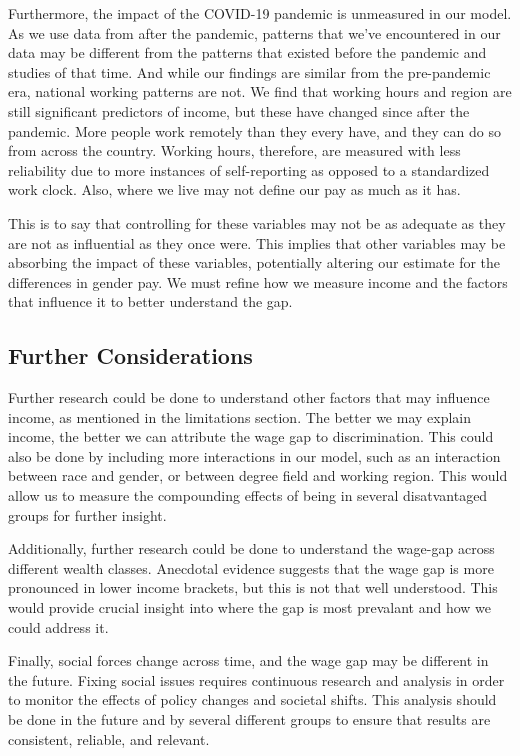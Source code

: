 \documentclass{article}
\begin{document}
Furthermore, the impact of the COVID-19 pandemic is unmeasured in our model. As we use data from after the pandemic, patterns that we've encountered in our data may be different
from the patterns that existed before the pandemic and studies of that time. And while our findings are similar from the pre-pandemic era, national working patterns are not.
We find that working hours and region are still significant predictors of income, but these have changed since after the pandemic. More people work remotely than they every have, and they can do so from across the country.
Working hours, therefore, are measured with less reliability due to more instances of self-reporting as opposed to a standardized work clock. Also, where we live may not define our pay as much as it has.

This is to say that controlling for these variables may not be as adequate as they are not as influential as they once were. This implies that other variables may be absorbing the impact of these variables, potentially altering our estimate for the differences 
in gender pay. We must refine how we measure income and the factors that influence it to better understand the gap.

\subsection*{Further Considerations}
Further research could be done to understand other factors that may influence income, as mentioned in the limitations section. The better
we may explain income, the better we can attribute the wage gap to discrimination. This could also be done by including more interactions in our model, such as an interaction between
race and gender, or between degree field and working region. This would allow us to measure the compounding effects of being in several disatvantaged groups for further insight.

Additionally, further research could be done to understand the wage-gap across different wealth classes. Anecdotal evidence suggests that the wage gap is more pronounced in lower income brackets, but
this is not that well understood. This would provide crucial insight into where the gap is most prevalant and how we could address it.

Finally, social forces change across time, and the wage gap may be different in the future. Fixing social issues requires continuous research and analysis in order to monitor the effects of 
policy changes and societal shifts. This analysis should be done in the future and by several different groups to ensure that results are consistent, reliable, and relevant.
\end{document}
